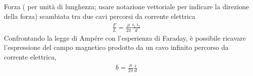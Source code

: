 \documentclass[letterpaper,10pt,italian]{jupyterBook}
\begin{document}
\sphinxAtStartPar
{} Forza ( per unità di lunghezza; usare notazione vettoriale per indicare la direzione della forza) scambiata tra due cavi percorsi da corrente elettrica
\begin{equation*}
\begin{split}\frac{F}{L} = \frac{\mu}{2 \pi} \frac{i_1 \, i_2}{d}\end{split}
\end{equation*}
\sphinxAtStartPar
Confrontando la legge di Ampére con l’esperienza di Faraday, è possibile ricavare l’espressione del campo magnetico prodotto da un cavo infinito percorso da corrente elettrica,
\begin{equation*}
\begin{split}b = \frac{\mu}{2 \pi} \frac{i}{d}\end{split}
\end{equation*}
\sphinxAtStartPar
{} 
\end{document}
